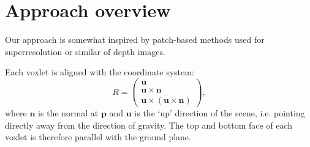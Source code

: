\documentclass[10pt,twocolumn,letterpaper]{article}
\makeatletter
\renewcommand*{\ie}{i.e.\@\xspace}
\newcommand{\point}{\mathbf{p}}
\newcommand{\normal}{\mathbf{n}}
\newcommand{\updir}{\mathbf{u}}
\newcommand{\remove}[1]{\textcolor{grey}{#1}}
\makeatother
\begin{document}


\section{Approach overview}



Our approach is somewhat inspired by patch-based methods used for superresolution or similar of depth images. 



Each voxlet is aligned with the coordinate system:
\begin{equation}
  R = 
  \left( \begin{array}{ccc}
  \updir \\
  \updir \times \normal \\
  \updir \times (\updir \times \normal)  \end{array} \right),
\end{equation}
where $\normal$ is the normal at $\point$ and $\updir$ is the `up' direction of the scene, \ie pointing directly away from the direction of gravity.
The top and bottom face of each voxlet is therefore parallel with the ground plane.





\end{document}
